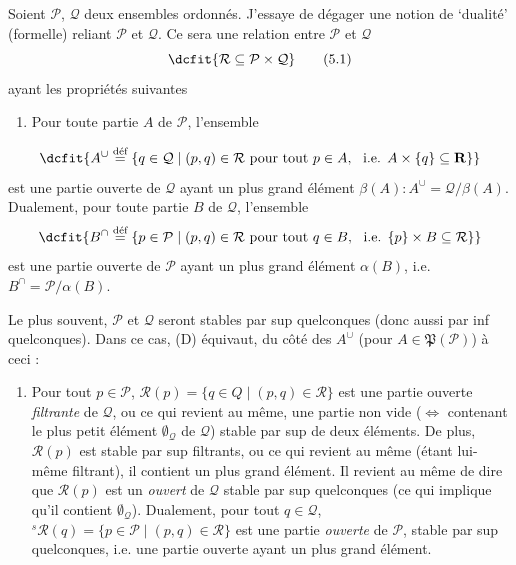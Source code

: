 \documentclass[11pt]{article}
\def\dcprintedpending{}
\newcommand{\msp}[1]{\marginpar{\footnotesize\raggedright
  \ifx\dcprintedpending\empty\else p.~\dcprintedpending\par\fi
  [#1]}\gdef\dcprintedpending{}}
\begin{document}
Soient $\mathcal{P}$, $\mathcal{Q}$ deux ensembles ordonnés. J'essaye de dégager une notion de `dualité' (formelle) reliant $\mathcal{P}$ et $\mathcal{Q}$. Ce sera une relation entre $\mathcal{P}$ et $\mathcal{Q}$
\[
\dcfit{\mathcal{R} \subseteq \mathcal{P} \times \mathcal{Q}
}
\tag*{(5.1)}
\]
ayant les propriétés suivantes
\begin{enumerate}[leftmargin=*, labelindent=0.5em]
\item[(D)] Pour toute partie $A$ de $\mathcal{P}$, l'ensemble
\end{enumerate}
\[
\dcfit{A^\cup \overset{\text{déf}}{=} \{ q \in \mathcal{Q} \mid (p,q) \in \mathcal{R} \text{ pour tout } p \in A,\ \text{ i.e. } A \times \{q\} \subseteq \mathbf{R} \} %
}
\]
est une partie ouverte de $\mathcal{Q}$ ayant un plus grand élément $\beta(A) : A^\cup = \mathcal{Q}/\beta(A)$. Dualement, pour toute partie $B$ de $\mathcal{Q}$, l'ensemble
\[
\dcfit{B^\cap \overset{\text{déf}}{=} \{ p \in \mathcal{P} \mid (p,q) \in \mathcal{R} \text{ pour tout } q \in B,\ \text{ i.e. } \{p\} \times B \subseteq \mathcal{R} \}
}
\]
est une partie ouverte de $\mathcal{P}$ ayant un plus grand élément $\alpha(B)$, i.e. $B^\cap = \mathcal{P}/\alpha(B)$.

Le plus souvent, $\mathcal{P}$ et $\mathcal{Q}$ seront stables par sup quelconques (donc aussi par inf quelconques). Dans ce cas, (D) équivaut, du côté des $A^\cup$ (pour $A \in \mathfrak{P}(\mathcal{P})$) à ceci :
\begin{enumerate}[leftmargin=*, labelindent=0em]
\item[(D$_0$)] Pour tout $p \in \mathcal{P}$, $\mathcal{R}(p) = \{ q \in Q \mid (p,q) \in \mathcal{R} \}$ est une partie ouverte \textit{filtrante} de $\mathcal{Q}$, ou ce qui revient au même, une partie non vide ($\Longleftrightarrow$ contenant le plus petit élément $\emptyset_{\mathcal{Q}}$ de $\mathcal{Q}$) stable par sup de deux éléments. De plus, $\mathcal{R}(p)$ est stable par sup filtrants, ou ce qui revient au même (étant lui-même filtrant), il contient un plus grand élément. Il revient %
\msp{page 70}
au même de dire que $\mathcal{R}(p)$ est un \textit{ouvert} de $\mathcal{Q}$ stable par sup quelconques (ce qui implique qu'il contient $\emptyset_{\mathcal{Q}}$). Dualement, pour tout $q \in \mathcal{Q}$, ${}^{s}\mathcal{R}(q) = \{ p \in \mathcal{P} \mid (p,q) \in \mathcal{R} \}$ est une partie \textit{ouverte} de $\mathcal{P}$, stable par sup quelconques, i.e. une partie ouverte ayant un plus grand élément. %
\end{enumerate}
\end{document}
